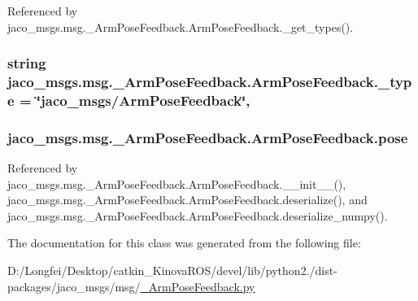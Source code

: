 Referenced by jaco\+\_\+msgs.\+msg.\+\_\+\+Arm\+Pose\+Feedback.\+Arm\+Pose\+Feedback.\+\_\+get\+\_\+types().

\subsubsection[{\texorpdfstring{\+\_\+type}{_type}}]{\setlength{\rightskip}{0pt plus 5cm}string jaco\+\_\+msgs.\+msg.\+\_\+\+Arm\+Pose\+Feedback.\+Arm\+Pose\+Feedback.\+\_\+type = \char`\"{}jaco\+\_\+msgs/{\bf Arm\+Pose\+Feedback}\char`\"{}\hspace{0.3cm}{\ttfamily [static]}, {\ttfamily [private]}}\hypertarget{classjaco__msgs_1_1msg_1_1__ArmPoseFeedback_1_1ArmPoseFeedback_a94e4d611cb6101b607c46ea879825ccb}{}\label{classjaco__msgs_1_1msg_1_1__ArmPoseFeedback_1_1ArmPoseFeedback_a94e4d611cb6101b607c46ea879825ccb}
\subsubsection[{\texorpdfstring{pose}{pose}}]{\setlength{\rightskip}{0pt plus 5cm}jaco\+\_\+msgs.\+msg.\+\_\+\+Arm\+Pose\+Feedback.\+Arm\+Pose\+Feedback.\+pose}\hypertarget{classjaco__msgs_1_1msg_1_1__ArmPoseFeedback_1_1ArmPoseFeedback_a9d4fd79ad0f686d06e0aec8f2b046b37}{}\label{classjaco__msgs_1_1msg_1_1__ArmPoseFeedback_1_1ArmPoseFeedback_a9d4fd79ad0f686d06e0aec8f2b046b37}


Referenced by jaco\+\_\+msgs.\+msg.\+\_\+\+Arm\+Pose\+Feedback.\+Arm\+Pose\+Feedback.\+\_\+\+\_\+init\+\_\+\+\_\+(), jaco\+\_\+msgs.\+msg.\+\_\+\+Arm\+Pose\+Feedback.\+Arm\+Pose\+Feedback.\+deserialize(), and jaco\+\_\+msgs.\+msg.\+\_\+\+Arm\+Pose\+Feedback.\+Arm\+Pose\+Feedback.\+deserialize\+\_\+numpy().



The documentation for this class was generated from the following file\+:\begin{DoxyCompactItemize}
\item 
D\+:/\+Longfei/\+Desktop/catkin\+\_\+\+Kinova\+R\+O\+S/devel/lib/python2./dist-\/packages/jaco\+\_\+msgs/msg/\hyperlink{__ArmPoseFeedback_8py}{\+\_\+\+Arm\+Pose\+Feedback.\+py}\end{DoxyCompactItemize}
